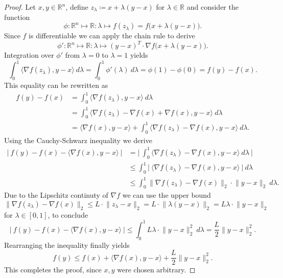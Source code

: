 \documentclass[11pt, a4paper]{article}
\newcommand{\R}{\mathds{R}}
\begin{document}
\begin{proof}
Let $x,y \in \R^n$, define $z_{\lambda} \coloneq x + \lambda (y - x)$ for $\lambda \in \R$ and consider the function
\[ \phi : \R^n \mapsto \R : \lambda \mapsto f(z_{\lambda}) = f \big (x + \lambda (y-x) \big ). \]
Since $f$ is differentiable we can apply the chain rule to derive
\[ \phi' : \R^n \mapsto \R : \lambda \mapsto (y-x)^T \cdot \nabla f \big ( x + \lambda (y-x) \big ). \]
Integration over $\phi'$ from $\lambda = 0$ to $\lambda = 1$ yields
\[ \int_{0}^{1} \big \langle \nabla f(z_{\lambda}), y-x \big \rangle \ d\lambda = \int_{0}^{1} \phi'(\lambda) \ d \lambda = \phi(1) - \phi(0) = f(y) - f(x). \]
This equality can be rewritten as
\[ \begin{split} 
f(y) - f(x) 
&= \int_{0}^{1}\big \langle \nabla f(z_{\lambda}), y-x \big \rangle \ d\lambda \\\
&= \int_{0}^{1} \big \langle \nabla f(z_{\lambda}) - \nabla f(x) + \nabla f(x) , y-x\big \rangle \ d\lambda \\\
&= \big \langle \nabla f(x), y-x \big \rangle + \int_{0}^{1} \big \langle \nabla f(z_{\lambda}) - \nabla f(x), y-x \big \rangle \ d\lambda.
\end{split} \]
Using the Cauchy-Schwarz inequality we derive
\[ \begin{split}
\Big | \ f(y) - f(x) - \big \langle \nabla f(x), y-x \big \rangle \ \Big | 
&= \Big | \ \int_{0}^{1} \big \langle \nabla f(z_{\lambda}) - \nabla f(x), y-x \big \rangle \ d\lambda \ \Big | \\\
&\leq \int_{0}^{1} \Big | \ \big \langle \nabla f(z_{\lambda}) - \nabla f(x), y-x \big \rangle \ \Big | \ d\lambda \\\
&\leq \int_{0}^{1} \big \| \nabla f( z_{\lambda}) - \nabla f(x) \big \|_2 \cdot \big \| y-x \big \|_2 \ d\lambda.
\end{split} \]
Due to the Lipschitz continuty of $\nabla f$ we can use the upper bound 
\[ \big \| \nabla f( z_{\lambda}) - \nabla f(x) \big \|_2 \leq L \cdot \big \| z_{\lambda} - x \big \|_2 = L \cdot \big \| \lambda(y-x) \big \|_2 = L\lambda \cdot \big \| y-x \big \|_2 \]
for $\lambda \in [0,1]$, to conclude
\[ \Big | \ f(y) - f(x) - \big \langle \nabla f(x), y-x \big \rangle \ \Big | \leq \int_{0}^{1} L\lambda \cdot \big \| y-x \big \|_2^2 \ d\lambda = \frac{L}{2} \big \| y-x \big \|_2^2. \]
Rearranging the inequality finally yields
\[ f(y) \leq f(x) + \big \langle \nabla f(x) , y -x \big \rangle + \frac{L}{2} \big \| y - x \big \|_2^2. \]
This completes the proof, since $x,y$ were chosen arbitrary.
\end{proof}
\end{document}
